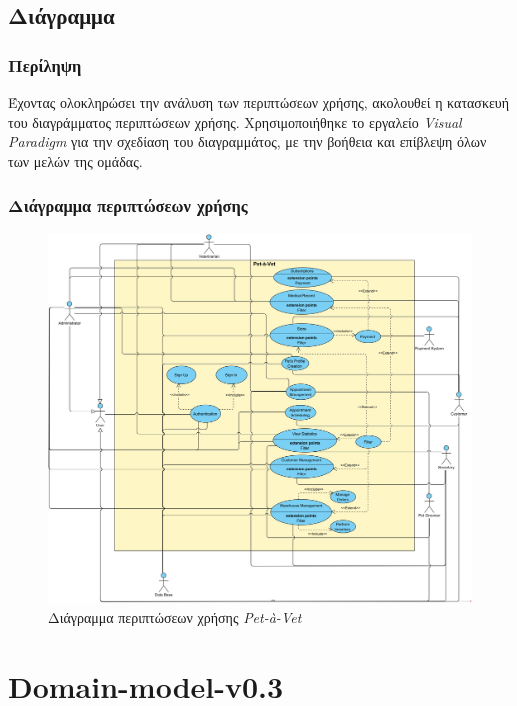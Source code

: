 \documentclass[12pt,a4paper,twoside]{book}
\begin{document}
\section{Διάγραμμα} %

\subsection{Περίληψη}

Έχοντας ολοκληρώσει την ανάλυση των περιπτώσεων χρήσης, ακολουθεί η κατασκευή του διαγράμματος περιπτώσεων χρήσης. Χρησιμοποιήθηκε το εργαλείο \textit{Visual Paradigm} για την σχεδίαση του διαγραμμάτος, με την βοήθεια και επίβλεψη όλων των μελών της ομάδας. %

\subsection{Διάγραμμα περιπτώσεων χρήσης}

\begin{figure}[H]
  \centering
  \includegraphics[width=1\textwidth]{Resources/Use-casel-v0.2.png}
  \caption{Διάγραμμα περιπτώσεων χρήσης \textit{Pet-à-Vet}}\label{fig:use-case-diagram}
\end{figure}

\chapter{Domain-model-v0.3}
\end{document}
